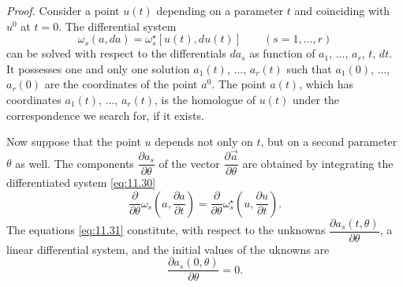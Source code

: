 \documentclass[leqno,11pt]{book}
\numberwithin{equation}{chapter}
\newcommand{\pd}{\partial}
\theoremstyle{shape1}
\theoremstyle{shapesmall}
\newcommand{\str}{^{\star}}
\newcommand{\somespace}{\vspace{9pt}}
\begin{document}
\somespace

\emph{Proof.} Consider a point $u(t)$ depending on a parameter $t$ and coinciding with $u^{0}$ at $t=0$. The differential system
\begin{equation}
  \label{eq:11.30}
  \omega_{s}(a,da)=\omega_{s}\str[u(t),du(t)]\qquad(s=1,\dots,r)
\end{equation}
can be solved with respect to the differentials $da_{s}$ as function of $a_{1}$, $\dots$, $a_{r}$, $t$, $dt$. It possesses one and only one solution $a_{1}(t)$, $\dots$, $a_{r}(t)$ such that $a_{1}(0)$, $\dots$, $a_{r}(0)$ are the coordinates of the point $a^{0}$. The point $a(t)$, which has coordinates $a_{1}(t)$, $\dots$, $a_{r}(t)$, is the homologue of $u(t)$ under the correspondence we search for, if it exists.

Now suppose that the point $u$ depends not only on $t$, but on a second parameter $\theta$ as well. The components $\dfrac{\pd a_{s}}{\pd \theta}$ of the vector $\dfrac{\pd \vec{a}}{\pd \theta}$ are obtained by integrating the differentiated system \eqref{eq:11.30}
\begin{equation}
  \label{eq:11.31}
  \frac{\pd}{\pd\theta}\omega_{s}\left(a,\frac{\pd a}{\pd t}\right)=\frac{\pd}{\pd\theta}\omega_{s}\str\left(u,\frac{\pd u}{\pd t}\right).
\end{equation}
The equations \eqref{eq:11.31} constitute, with respect to the unknowns $\dfrac{\pd a_{s}(t,\theta)}{\pd\theta}$, a linear differential system, and the initial values of the uknowns are
\[
\frac{\pd a_{s}(0,\theta)}{\pd \theta}=0.
\]
\end{document}
